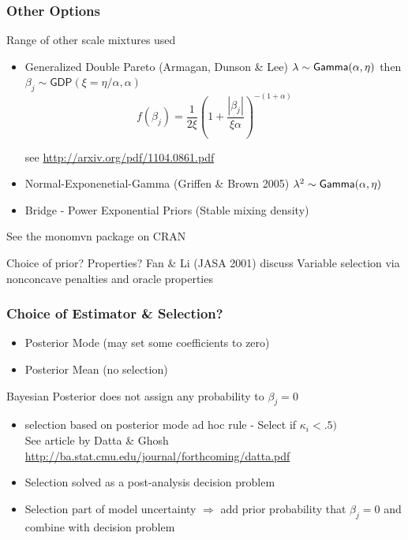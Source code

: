 \documentclass[handout]{beamer}
\begin{document}
\begin{frame}
  \frametitle{Other Options}
  Range of other scale mixtures used  \pause
  \begin{itemize}
  \item Generalized Double Pareto (Armagan, Dunson \& Lee)  \pause
$\lambda \sim \textsf{Gamma}(\alpha, \eta)$  then $\beta_j \sim \textsf{GDP}(\xi
= \eta/\alpha, \alpha)$  \pause
$$
f(\beta_j) = \frac{1}{2 \xi} (1 + \frac{|\beta_j|}{\xi \alpha})^{-(1 + \alpha)}
$$

see \url{http://arxiv.org/pdf/1104.0861.pdf} \pause
  \item Normal-Exponenetial-Gamma (Griffen \& Brown 2005)
$\lambda^2 \sim \textsf{Gamma}(\alpha, \eta)$ 
  \pause
  \item Bridge - Power Exponential Priors  (Stable mixing density) \pause

   \end{itemize}
See the monomvn package on CRAN \pause

\vfill

Choice of prior?   Properties?  Fan \& Li (JASA 2001) discuss Variable
selection via nonconcave penalties and oracle properties
\end{frame}

\begin{frame}
  \frametitle{Choice of Estimator \& Selection?}

  \begin{itemize}
  \item Posterior Mode (may set some coefficients to zero) \pause
  \item Posterior Mean (no selection) \pause
  \end{itemize}
  Bayesian Posterior does not assign any probability to $\beta_j = 0$ \pause

  \begin{itemize}
  \item selection based on posterior mode ad hoc rule - Select if
    $\kappa_i < .5)$ \pause \\
See  article by  Datta \& Ghosh
\url{http://ba.stat.cmu.edu/journal/forthcoming/datta.pdf} \pause
  \item Selection solved as a post-analysis decision problem \pause
  \item Selection part of model uncertainty $\Rightarrow$ add prior \pause
    probability that $\beta_j = 0$  and combine with decision problem 
  \end{itemize}
\end{frame}
\end{document}
